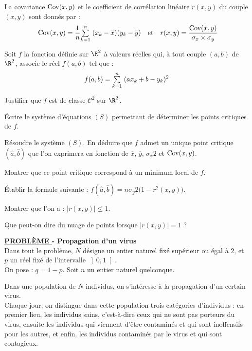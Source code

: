 \documentclass[11pt]{article}%
\begin{document}
\n La covariance $\operatorname{Cov}(x,y)$ et le coefficient de corrélation linéaire
$r(x,y)$ du couple $(x,y)$ sont donnés par :
\[
 \ \operatorname{Cov}(x,y) = \frac{1}{n}{\textstyle\sum\limits_{k =
1}^{n}}\hspace{.1cm}(x_{k}-\overline{x})(y_{k}-\overline{y})\quad\mathrm{et}\quad
r(x,y) = \frac{\operatorname{Cov}(x,y)}{\sigma_{x}\times\sigma_{y}}
\]

\n Soit $f$ la fonction définie sur $\R^{2}$ à valeurs réelles qui, à
tout couple $(a,b)$ de $\R^{2}$, associe le réel $f(a,b)$ tel que :
\[
f(a,b) = {\textstyle\sum\limits_{k = 1}^{n}}\hspace{.1cm} (ax_{k} + b-y_{k})^{2}
\]

\en\item Justifier que $f$ est de classe $\mathscr C^{2}$ sur $\R^{2}$.
\item \en\item Écrire le système d'équations $(S)$ permettant de
déterminer les points critiques de $f$.
\item Résoudre le système $(S)$. En déduire que $f$ admet un unique
point critique $(\hat{a},\hat{b})$ que l'on exprimera en fonction de
$\overline{x}$, $\overline{y}$, $\sigma_{x}{2}$ et $\operatorname{Cov}(x,y)$.
\item Montrer que ce point critique correspond à un minimum local de
$f$.
\item Établir la formule suivante : $f(\hat{a},\hat{b}) =
n\sigma_{y}{2} \big(1-r^{2}(x,y)\big)$.
\een\item
\en\item Montrer que l'on a : $|r(x,y)|\leq 1$.
\item Que peut-on dire du nuage de points lorsque $|r(x,y)| = 1$
?\een\een
\newpage


\n\textbf{\large{\underline{PROBL\`{E}ME } - Propagation d'un
virus}}\quad\\

\n Dans tout le problème, $N$ désigne un entier naturel fixé 
supérieur ou égal à $2$, et $p$ un réel fixé de
l'intervalle $\left] 0,1\right[ $.\\
\n On pose : $q = 1-p$. Soit $n$ un entier naturel quelconque.

\n Dans une population de $N$ individus, on s'intéresse à la
propagation d'un certain virus. \\
\n Chaque jour, on distingue dans cette population trois catégories
d'individus : en premier lieu, les individus sains, c'est-à-dire ceux
qui ne sont pas porteurs du virus, ensuite les individus qui viennent
d'être contaminés et qui sont inoffensifs pour les autres, et enfin,
les
individus contaminés par le virus et qui sont contagieux.\\
\end{document}
